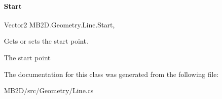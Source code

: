 \paragraph{\texorpdfstring{Start}{Start}}
{\footnotesize\ttfamily Vector2 M\+B2\+D.\+Geometry.\+Line.\+Start\hspace{0.3cm}{\ttfamily [get]}, {\ttfamily [set]}}



Gets or sets the start point. 

The start point

The documentation for this class was generated from the following file\+:\begin{DoxyCompactItemize}
\item 
M\+B2\+D/src/\+Geometry/Line.\+cs\end{DoxyCompactItemize}
